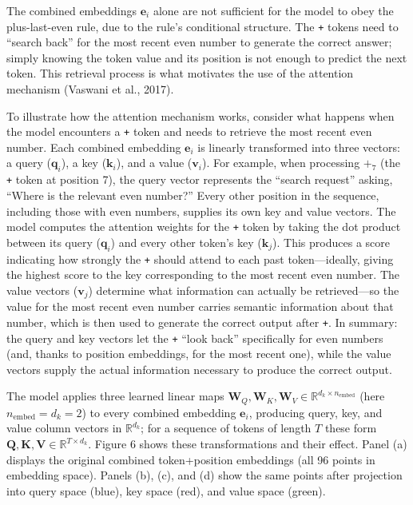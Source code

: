 \documentclass[
  11pt,
  a4paper,
]{article}
\begin{document}
The combined embeddings \(\mathbf{e}_i\) alone are not sufficient for
the model to obey the plus-last-even rule, due to the rule's conditional
structure. The \texttt{+} tokens need to ``search back'' for the most
recent even number to generate the correct answer; simply knowing the
token value and its position is not enough to predict the next token.
This retrieval process is what motivates the use of the attention
mechanism (Vaswani et al., 2017).

To illustrate how the attention mechanism works, consider what happens
when the model encounters a \texttt{+} token and needs to retrieve the
most recent even number. Each combined embedding \(\mathbf{e}_i\) is
linearly transformed into three vectors: a query (\(\mathbf{q}_i\)), a
key (\(\mathbf{k}_i\)), and a value (\(\mathbf{v}_i\)). For example,
when processing \(+_7\) (the \texttt{+} token at position 7), the query
vector represents the ``search request'' asking, ``Where is the relevant
even number?'' Every other position in the sequence, including those
with even numbers, supplies its own key and value vectors. The model
computes the attention weights for the \texttt{+} token by taking the
dot product between its query (\(\mathbf{q}_i\)) and every other token's
key (\(\mathbf{k}_j\)). This produces a score indicating how strongly
the \texttt{+} should attend to each past token---ideally, giving the
highest score to the key corresponding to the most recent even number.
The value vectors (\(\mathbf{v}_j\)) determine what information can
actually be retrieved---so the value for the most recent even number
carries semantic information about that number, which is then used to
generate the correct output after \texttt{+}. In summary: the query and
key vectors let the \texttt{+} ``look back'' specifically for even
numbers (and, thanks to position embeddings, for the most recent one),
while the value vectors supply the actual information necessary to
produce the correct output.

The model applies three learned linear maps
\(\mathbf{W}_Q, \mathbf{W}_K, \mathbf{W}_V \in \mathbb{R}^{d_k \times n_{\mathrm{embed}}}\)
(here \(n_{\mathrm{embed}} = d_k = 2\)) to every combined embedding
\(\mathbf{e}_i\), producing query, key, and value column vectors in
\(\mathbb{R}^{d_k}\); for a sequence of tokens of length \(T\) these
form
\(\mathbf{Q}, \mathbf{K}, \mathbf{V} \in \mathbb{R}^{T \times d_k}\).
Figure 6 shows these transformations and their effect. Panel (a)
displays the original combined token+position embeddings (all 96 points
in embedding space). Panels (b), (c), and (d) show the same points after
projection into query space (blue), key space (red), and value space
(green).
\end{document}
